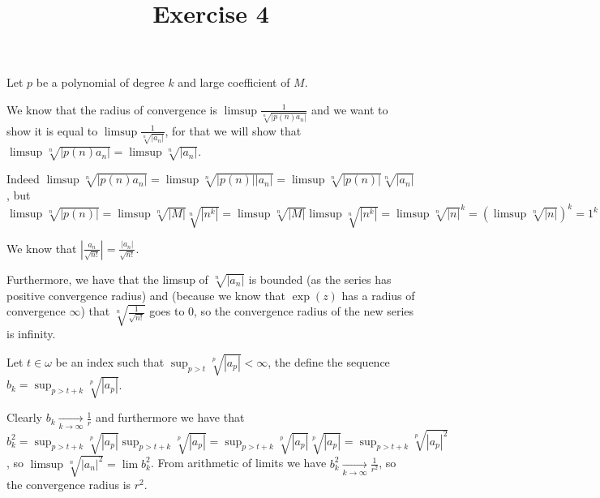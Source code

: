 

\usepackage{skak}
\usepackage{relsize}
\usepackage{graphicx}
\usepackage{mathtools}

\usepackage{textcomp}
\usepackage{bbding}

\usepackage{soul}

\newcommand{\flower}{\text{\scalebox{0.75}{\raisebox{-0.7ex}{
				\rotatebox{90}{\textleaf}\hspace{-0.3em}
				\scalebox{0.7}{\textleaf}\hspace{-1.35em}
				\raisebox{1ex}{\scalebox{0.8}{\FiveFlowerOpen}}
}}}}
\newcommand{\ei}[1]{e^{i#1}}


\title{Exercise 4}

\maketitle
\begin{cExercise}[][][author]
	\begin{cPart}
		Let $p$ be a polynomial of degree $k$ and large coefficient of $M$.
		
		We know that the radius of convergence is $\limsup\frac1{\sqrt[n]{|p(n)a_n|}}$ and we want to show it is equal to $\limsup\frac1{\sqrt[n]{|a_n|}}$, for that we will show that $\limsup \sqrt[n]{|p(n)a_n|}=\limsup \sqrt[n]{|a_n|}$.
		
		Indeed $\limsup \sqrt[n]{|p(n)a_n|}=\limsup \sqrt[n]{|p(n)||a_n|}=\limsup \sqrt[n]{|p(n)|}\sqrt[n]{|a_n|}$, but $\limsup \sqrt[n]{|p(n)|}=\limsup \sqrt[n]{|M|}\sqrt[n]{|n^k|}=\limsup \sqrt[n]{|M|}\limsup \sqrt[n]{|n^k|}=\limsup \sqrt[n]{|n|}^k=(\limsup \sqrt[n]{|n|})^k=1^k=1.$
	\end{cPart}
	\begin{cPart}
		We know that $|\frac{a_n}{\sqrt{n!}}|=\frac{|a_n|}{\sqrt{n!}}$.
		
		Furthermore, we have that the limsup of $\sqrt[n]{|a_n|}$ is bounded (as the series has positive convergence radius) and (because we know that $\exp(z)$ has a radius of convergence $\infty$) that $\sqrt[n]{\frac1{\sqrt{n!}}}$ goes to $0$, so the convergence radius of the new series is infinity.
		
		Let $t\in\omega$ be an index such that $\sup_{p>t}\sqrt[p]{|a_p|}<\infty$, the define the sequence $b_k=\sup_{p>t+k}\sqrt[p]{|a_p|}$.
		
		Clearly $b_k\underset{k\to\infty}{\longrightarrow}\frac1r$ and furthermore we have that $b_k^2=\sup_{p>t+k}\sqrt[p]{|a_p|}\sup_{p>t+k}\sqrt[p]{|a_p|}=\sup_{p>t+k}\sqrt[p]{|a_p|}\sqrt[p]{|a_p|}=\sup_{p>t+k}\sqrt[p]{|a_p|^2}$, so $\limsup{\sqrt[n]{|a_n|^2}}=\lim b_k^2$. From arithmetic of limits we have $b_k^2\underset{k\to\infty}{\longrightarrow}\frac1{r^2}$, so the convergence radius is $r^2$.
	\end{cPart}
\end{cExercise}

